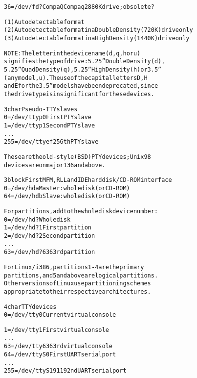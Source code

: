\documentclass[a4paper,8pt,english]{sphinxmanual}
\begin{document}
\begin{alltt}
                 36 = /dev/fd?CompaQ    Compaq 2880K drive; obsolete?

                (1) Autodetectable format
                (2) Autodetectable format in a Double Density (720K) drive only
                (3) Autodetectable format in a High Density (1440K) drive only

                NOTE: The letter in the device name (d, q, h or u)
                signifies the type of drive: 5.25'' Double Density (d),
                5.25'' Quad Density (q), 5.25'' High Density (h) or 3.5''
                (any model, u).  The use of the capital letters D, H
                and E for the 3.5'' models have been deprecated, since
                the drive type is insignificant for these devices.

   3 char       Pseudo-TTY slaves
                  0 = /dev/ttyp0        First PTY slave
                  1 = /dev/ttyp1        Second PTY slave
                    ...
                255 = /dev/ttyef        256th PTY slave

                These are the old-style (BSD) PTY devices; Unix98
                devices are on major 136 and above.

   3 block      First MFM, RLL and IDE hard disk/CD-ROM interface
                  0 = /dev/hda          Master: whole disk (or CD-ROM)
                 64 = /dev/hdb          Slave: whole disk (or CD-ROM)

                For partitions, add to the whole disk device number:
                  0 = /dev/hd?          Whole disk
                  1 = /dev/hd?1         First partition
                  2 = /dev/hd?2         Second partition
                    ...
                 63 = /dev/hd?63        63rd partition

                For Linux/i386, partitions 1-4 are the primary
                partitions, and 5 and above are logical partitions.
                Other versions of Linux use partitioning schemes
                appropriate to their respective architectures.

   4 char       TTY devices
                  0 = /dev/tty0         Current virtual console

                  1 = /dev/tty1         First virtual console
                    ...
                 63 = /dev/tty63        63rd virtual console
                 64 = /dev/ttyS0        First UART serial port
                    ...
                255 = /dev/ttyS191      192nd UART serial port


\end{alltt}
\end{document}
